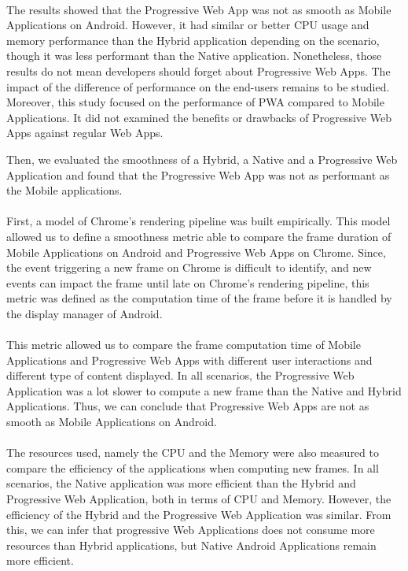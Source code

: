 \documentclass{kththesis}
\begin{document}
\paragraph{}
The results showed that the Progressive Web App was not as smooth as Mobile Applications on Android. However, it had similar or better CPU usage and memory performance than the Hybrid application depending on the scenario, though it was less performant than the Native application. \newline
Nonetheless, those results do not mean developers should forget about Progressive Web Apps. The impact of the difference of performance on the end-users remains to be studied. Moreover, this study focused on the performance of PWA compared to Mobile Applications. It did not examined the benefits or drawbacks of Progressive Web Apps against regular Web Apps.


\iffalse
Then, we evaluated the smoothness of a Hybrid, a Native and a Progressive Web Application and found that the Progressive Web App was not as performant as the Mobile applications. 
\paragraph{}
First, a model of Chrome's rendering pipeline was built empirically. This model allowed us to define a smoothness metric able to compare the frame duration of Mobile Applications on Android and Progressive Web Apps on Chrome. Since, the event triggering a new frame on Chrome is difficult to identify, and new events can impact the frame until late on Chrome's rendering pipeline, this metric was defined as the computation time of the frame before it is handled by the display manager of Android. 
\paragraph{}
This metric allowed us to compare the frame computation time of Mobile Applications and Progressive Web Apps with different user interactions and different type of content displayed. In all scenarios, the Progressive Web Application was a lot slower to compute a new frame than the Native and Hybrid Applications. Thus, we can conclude that Progressive Web Apps are not as smooth as Mobile Applications on Android. 
\paragraph{}
The resources used, namely the CPU and the Memory were also measured to compare the efficiency of the applications when computing new frames. In all scenarios, the Native application was more efficient than the Hybrid and Progressive Web Application, both in terms of CPU and Memory. However, the efficiency of the Hybrid and the Progressive Web Application was similar. From this, we can infer that progressive Web Applications does not consume more resources than Hybrid applications, but Native Android Applications remain more efficient.
\end{document}

